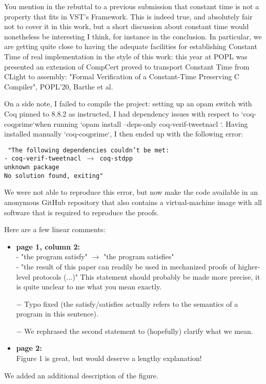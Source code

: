 You mention in the rebuttal to a previous submission that constant time is not a property that fits in VST's Framework. This is indeed true, and absolutely fair not to cover it in this work, but a short discussion about constant time would nonetheless be interesting I think, for instance in the conclusion. In particular, we are getting quite close to having the adequate facilities for establishing Constant Time of real implementation in the style of this work: this year at POPL was presented an extension of CompCert proved to transport Constant Time from CLight to assembly:
"Formal Verification of a Constant-Time Preserving C Compiler", POPL'20, Barthe et al.

On a side note, I failed to compile the project: setting up an opam switch with Coq pinned to 8.8.2 as instructed, I had dependency issues with respect to `coq-coqprime`when running `opam install --deps-only coq-verif-tweetnacl `. Having installed manually `coq-coqprime`, I then ended up with the following error:

{\footnotesize\texttt{
  "The following dependencies couldn't be met:\\
  - coq-verif-tweetnacl $\rightarrow$ coq-stdpp \\
  unknown package\\
  No solution found, exiting"}}
\begin{answer}
  We were not able to reproduce this error, but
  now make the code available in an anonymous GitHub repository that also contains
  a virtual-machine image with all software that is required to reproduce the proofs.
\end{answer}

Here are a few linear comments:

\begin{itemize}
  \item \textbf{page 1, column 2:}\\
        - "the program satisfy" $\rightarrow$ "the program satisfies"\\
        - "the result of this paper can readily be used in mechanized proofs of higher-level protocols (...)"
        This statement should probably be made more precise, it is quite unclear to me what you mean exactly.
\end{itemize}
\begin{answer}
  \begin{itemize}
    \item[$-$] Typo fixed (the satisfy/satisfies actually refers to the semantics of a program in this sentence).
    \item[$-$]We rephrased the second statement to (hopefully) clarify what we mean.
  \end{itemize}
\end{answer}
\begin{itemize}

  \item \textbf{page 2:}\\
        Figure 1 is great, but would deserve a lengthy explanation!
\end{itemize}
\begin{answer}
  We added an additional description of the figure.
\end{answer}


